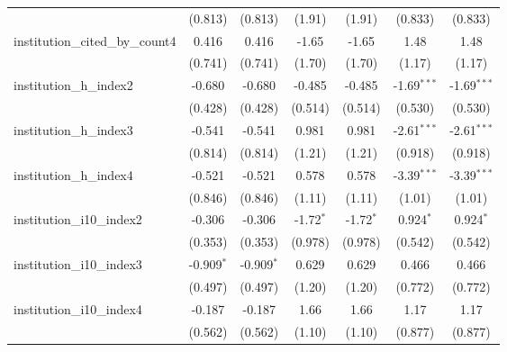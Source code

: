 \begin{tabular}{lcccccc}
                                         & (0.813)       & (0.813)       & (1.91)        & (1.91)        & (0.833)       & (0.833)\\   
   institution\_cited\_by\_count4        & 0.416         & 0.416         & -1.65         & -1.65         & 1.48          & 1.48\\   
                                         & (0.741)       & (0.741)       & (1.70)        & (1.70)        & (1.17)        & (1.17)\\   
   institution\_h\_index2                & -0.680        & -0.680        & -0.485        & -0.485        & -1.69$^{***}$ & -1.69$^{***}$\\   
                                         & (0.428)       & (0.428)       & (0.514)       & (0.514)       & (0.530)       & (0.530)\\   
   institution\_h\_index3                & -0.541        & -0.541        & 0.981         & 0.981         & -2.61$^{***}$ & -2.61$^{***}$\\   
                                         & (0.814)       & (0.814)       & (1.21)        & (1.21)        & (0.918)       & (0.918)\\   
   institution\_h\_index4                & -0.521        & -0.521        & 0.578         & 0.578         & -3.39$^{***}$ & -3.39$^{***}$\\   
                                         & (0.846)       & (0.846)       & (1.11)        & (1.11)        & (1.01)        & (1.01)\\   
   institution\_i10\_index2              & -0.306        & -0.306        & -1.72$^{*}$   & -1.72$^{*}$   & 0.924$^{*}$   & 0.924$^{*}$\\   
                                         & (0.353)       & (0.353)       & (0.978)       & (0.978)       & (0.542)       & (0.542)\\   
   institution\_i10\_index3              & -0.909$^{*}$  & -0.909$^{*}$  & 0.629         & 0.629         & 0.466         & 0.466\\   
                                         & (0.497)       & (0.497)       & (1.20)        & (1.20)        & (0.772)       & (0.772)\\   
   institution\_i10\_index4              & -0.187        & -0.187        & 1.66          & 1.66          & 1.17          & 1.17\\   
                                         & (0.562)       & (0.562)       & (1.10)        & (1.10)        & (0.877)       & (0.877)\\   

\end{tabular}
